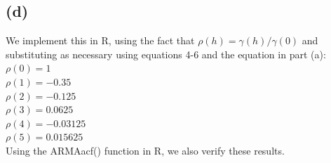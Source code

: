 \documentclass{article}
\begin{document}
{\subsection*{(d)}

We implement this in R, using the fact that $\rho(h) = \gamma(h) / \gamma(0)$ and substituting as necessary using equations 4-6 and the equation in part (a): \\
$\rho(0) = 1$ \\
$\rho(1) = -0.35$ \\
$\rho(2) = -0.125$ \\
$\rho(3) = 0.0625$ \\
$\rho(4) = -0.03125$ \\
$\rho(5) = 0.015625$ \\
Using the ARMAacf() function in R, we also verify these results.
\newpage

}
\end{document}
